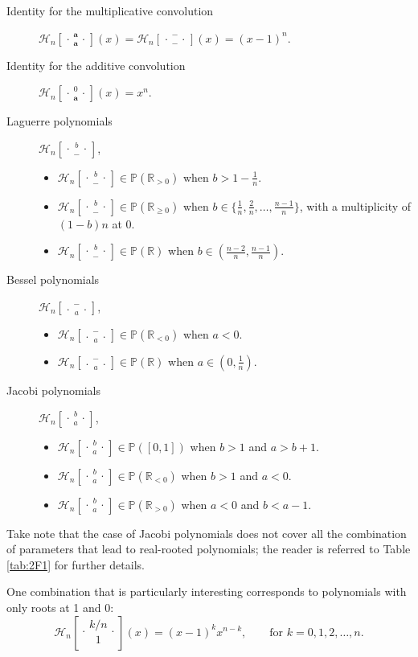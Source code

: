\documentclass[reqno,11pt]{amsart}
\theoremstyle{remark}
\renewcommand{\P}{\mathbb{P}}
\newcommand{\rr}{\mathbb{R}}
\newcommand*\HGP[3]{%
 \mathcal{H}_{#1}{\left[\genfrac..{0pt}{1}{#2}{#3}\right]}%
}
\begin{document}
\begin{description}
    \item[Identity for the multiplicative convolution] $\HGP{n}{\bm a}{\bm a}(x)=\HGP{n}{-}{-}(x)=(x-1)^n$.

     \item[Identity for the additive convolution] $\HGP{n}{0}{\bm a}(x)=x^n$.

     \item[Laguerre polynomials] $\HGP{n}{b}{-}$,
     \begin{itemize}
         \item $\HGP{n}{b}{-}\in \P(\rr_{> 0})$ when $b>1-\frac{1}{n}$. 
        \item $\HGP{n}{b}{-}\in \P(\rr_{\geq 0})$ when $b\in\{\frac{1}{n},\frac{2}{n}, \dots, \frac{n-1}{n}\}$, with a multiplicity of $(1-b)n$ at $0$.
        \item $\HGP{n}{b}{-}\in \P(\rr)$ when $b\in (\frac{n-2}{n},\frac{n-1}{n})$.
     \end{itemize}

     \item[Bessel polynomials] $\HGP{n}{-}{a}$,
     \begin{itemize}
         \item $\HGP{n}{-}{a}\in \P(\rr_{< 0})$ when $a<0$.
        \item $\HGP{n}{-}{a}\in \P(\rr)$ when $a\in (0,\frac{1}{n})$.
     \end{itemize}

     \item[Jacobi polynomials] $\HGP{n}{b}{a}$,
     \begin{itemize}
         \item $\HGP{n}{b}{a}\in \P([0,1])$ when $b >1$ and $a>b+1$.
        \item $\HGP{n}{b}{a}\in \P(\rr_{<0})$ when $b>1$ and $a<0$.
        \item $\HGP{n}{b}{a}\in \P(\rr_{>0})$ when $a<0$ and $b<a-1$. 
     \end{itemize}
\end{description}
Take note that the case of Jacobi polynomials does not cover all the combination of parameters that lead to real-rooted polynomials; the reader is referred to Table \ref{tab:2F1} for further details. 

One combination that is particularly interesting corresponds to polynomials with only roots at 1 and 0:
$$
\HGP{n}{k/n}{1}(x) =(x-1)^{k}x^{n-k}, \qquad \text{for }k=0,1,2,\dots, n.
$$
\end{document}
